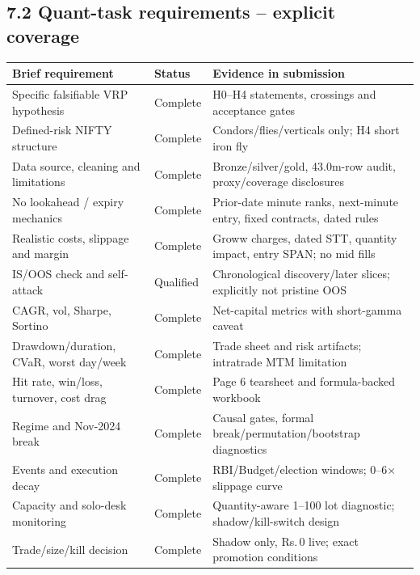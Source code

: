 \documentclass[10pt,a4paper]{article}
\newcommand{\INR}{\textsf{Rs.}\,}
\begin{document}
\subsection*{7.2 Quant-task requirements -- explicit coverage}
\begin{tabularx}{\linewidth}{@{}p{51mm}p{22mm}Y@{}}
\toprule
Brief requirement & Status & Evidence in submission \\
\midrule
Specific falsifiable VRP hypothesis & Complete & H0--H4 statements, crossings and acceptance gates \\
Defined-risk NIFTY structure & Complete & Condors/flies/verticals only; H4 short iron fly \\
Data source, cleaning and limitations & Complete & Bronze/silver/gold, 43.0m-row audit, proxy/coverage disclosures \\
No lookahead / expiry mechanics & Complete & Prior-date minute ranks, next-minute entry, fixed contracts, dated rules \\
Realistic costs, slippage and margin & Complete & Groww charges, dated STT, quantity impact, entry SPAN; no mid fills \\
IS/OOS check and self-attack & Qualified & Chronological discovery/later slices; explicitly not pristine OOS \\
CAGR, vol, Sharpe, Sortino & Complete & Net-capital metrics with short-gamma caveat \\
Drawdown/duration, CVaR, worst day/week & Complete & Trade sheet and risk artifacts; intratrade MTM limitation \\
Hit rate, win/loss, turnover, cost drag & Complete & Page 6 tearsheet and formula-backed workbook \\
Regime and Nov-2024 break & Complete & Causal gates, formal break/permutation/bootstrap diagnostics \\
Events and execution decay & Complete & RBI/Budget/election windows; 0--6$\times$ slippage curve \\
Capacity and solo-desk monitoring & Complete & Quantity-aware 1--100 lot diagnostic; shadow/kill-switch design \\
Trade/size/kill decision & Complete & Shadow only, \INR0 live; exact promotion conditions \\
\bottomrule
\end{tabularx}
\end{document}

